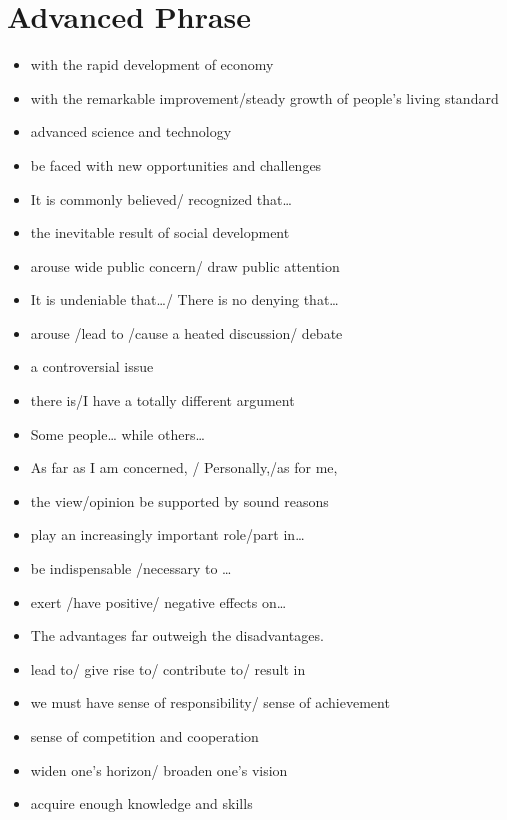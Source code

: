 \twocolumn
\chapter{Advanced Phrase}
\balance
\begin{itemize}
    \item with the rapid development of economy
    \item with the remarkable improvement/steady growth of people's living standard
    \item advanced science and technology
    \item be faced with new opportunities and challenges
    \item It is commonly believed/ recognized that…
    \item the inevitable result of social development
    \item arouse wide public concern/ draw public attention
    \item It is undeniable that…/ There is no denying that…
    \item arouse /lead to /cause a heated discussion/ debate
    \item a controversial issue
    \item there is/I have a totally different argument
    \item Some people… while others…
    \item As far as I am concerned, / Personally,/as for me,
    \item the view/opinion be supported by sound reasons
    \item play an increasingly important role/part in…
    \item be indispensable /necessary to …
    \item exert /have positive/ negative effects on…
    \item The advantages far outweigh the disadvantages.
    \item lead to/ give rise to/ contribute to/ result in
    \item we must have sense of responsibility/ sense of achievement
    \item sense of competition and cooperation
    \item widen one's horizon/ broaden one's vision
    \item acquire enough knowledge and skills
\end{itemize}


\onecolumn